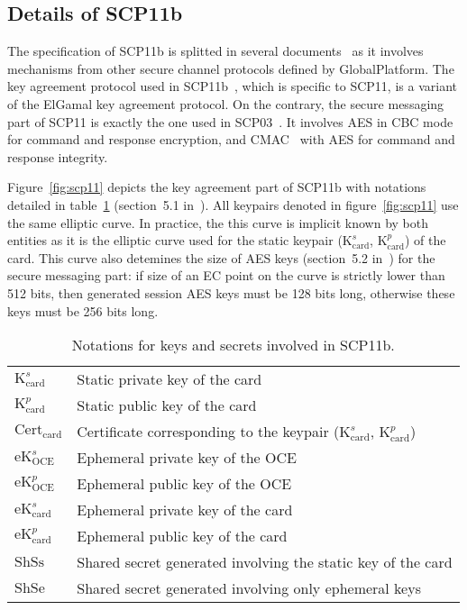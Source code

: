 \documentclass[dvipdfmx,11pt,a4paper,english,final]{article}
\newcommand{\gp}[0]{Glo\-bal\-Plat\-form\xspace}
\newcommand{\cardks}[0]{\ensuremath{\mathrm{K}_\mathrm{card}^s}\xspace}
\newcommand{\cardkp}[0]{\ensuremath{\mathrm{K}_\mathrm{card}^p}\xspace}
\newcommand{\cardcert}[0]{\ensuremath{\mathrm{Cert}_\mathrm{card}}\xspace}
\newcommand{\cardeks}[0]{\ensuremath{\mathrm{eK}_\mathrm{card}^s}\xspace}
\newcommand{\cardekp}[0]{\ensuremath{\mathrm{eK}_\mathrm{card}^p}\xspace}
\newcommand{\oceeks}[0]{\ensuremath{\mathrm{eK}_\mathrm{OCE}^s}\xspace}
\newcommand{\oceekp}[0]{\ensuremath{\mathrm{eK}_\mathrm{OCE}^p}\xspace}
\newcommand{\shse}[0]{\ensuremath{\mathrm{ShSe}}\xspace}
\newcommand{\shss}[0]{\ensuremath{\mathrm{ShSs}}\xspace}
\begin{document}
\subsection{Details of SCP11b}

The specification of SCP11b is splitted in several
documents~\cite{gp-scp03, gp-upgrade, gp-scp11} as it involves
mechanisms from other secure channel protocols defined by \gp. The key
agreement protocol used in SCP11b~\cite{gp-scp11}, which is specific
to SCP11, is a variant of the ElGamal key agreement protocol. On the
contrary, the secure messaging part of SCP11 is exactly the one used
in SCP03~\cite{gp-scp03}. It involves AES in CBC mode for
command and response encryption, and CMAC~\cite{nist-cmac} with AES for
command and response integrity.

Figure~\ref{fig:scp11} depicts the key agreement part of SCP11b with
notations detailed in table~\ref{tab:notations} (section~5.1
in~\cite{gp-scp11}). All keypairs denoted in figure~\ref{fig:scp11} use the same
elliptic curve. In practice, the this curve is implicit known by both
entities as it is the elliptic curve used for the static keypair
(\cardks, \cardkp) of the card. This curve also detemines the size of
AES keys (section~5.2 in~\cite{gp-scp11}) for the secure messaging
part: if size of an EC point on the curve is strictly lower than 512
bits, then generated session AES keys must be 128 bits long, otherwise
these keys must be 256 bits long.

\begin{table}[ht]
  \centering
  \begin{tabular}{|l|l|}
    \hline
    \cardks&Static private key of the card\\
    \cardkp&Static public key of the card\\
    \cardcert&Certificate corresponding to the keypair (\cardks, \cardkp)\\
    \hline
    \oceeks&Ephemeral private key of the OCE\\
    \oceekp&Ephemeral public key of the OCE\\
    \cardeks&Ephemeral private key of the card\\
    \cardekp&Ephemeral public key of the card\\
    \hline
    \shss&Shared secret generated involving the static key of the card\\
    \shse&Shared secret generated involving only ephemeral keys\\
    \hline
  \end{tabular}
  \caption{Notations for keys and secrets involved in SCP11b.}
  \label{tab:notations}
\end{table}
\end{document}
